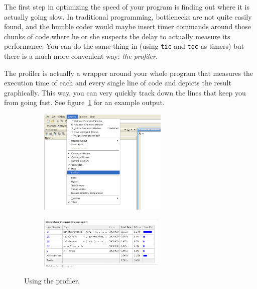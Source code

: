 The first step in optimizing the speed of your program is finding out where it
is actually going slow. In traditional programming, bottlenecks are not quite
easily found, and the humble coder would maybe insert timer commands around
those chunks of code where he or she suspects the delay to actually measure
its performance. You can do the same thing in \matlab{} (using \lstinline!tic!
and \lstinline!toc! as timers) but there is a much more convenient way:
\emph{the profiler}.

The profiler is actually a wrapper around your whole program that measures the
execution time of each and every single line of code and depicts the result
graphically. This way, you can very quickly track down the lines that keep you
from going fast. See figure~\ref{figure:profiler} for an example output.

\begin{figure}
\centering
\begin{subfigure}[b]{0.45\textwidth}
  \includegraphics[height=5cm]{figures/matlab-open-profiler.png}
\end{subfigure}
\hfill
\begin{subfigure}[b]{0.45\textwidth}
  \includegraphics[width=6cm]{figures/matlab-profiler-circleBox-result.png}
\end{subfigure}
\caption{Using the profiler.}
\label{figure:profiler}
\end{figure}

